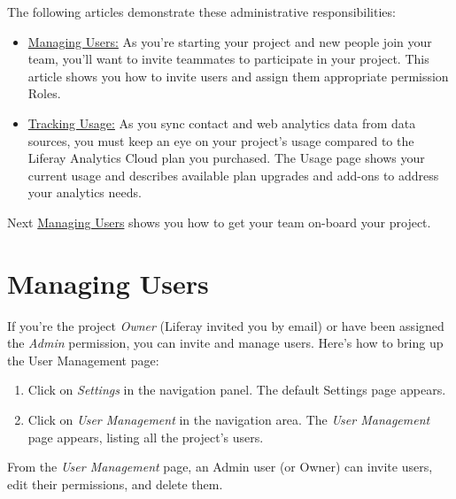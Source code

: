 The following articles demonstrate these administrative
responsibilities:

\begin{itemize}
\item
  \href{https://github.com/liferay/liferay-docs/blob/7.1.x/discover/analytics-cloud/articles/05-getting-started/02-managing-users.markdown}{Managing
  Users:} As you're starting your project and new people join your team,
  you'll want to invite teammates to participate in your project. This
  article shows you how to invite users and assign them appropriate
  permission Roles.
\item
  \href{https://github.com/liferay/liferay-docs/blob/7.1.x/discover/analytics-cloud/articles/05-getting-started/03-tracking-usage.markdown}{Tracking
  Usage:} As you sync contact and web analytics data from data sources,
  you must keep an eye on your project's usage compared to the Liferay
  Analytics Cloud plan you purchased. The Usage page shows your current
  usage and describes available plan upgrades and add-ons to address
  your analytics needs.
\end{itemize}

Next
\href{https://github.com/liferay/liferay-docs/blob/7.1.x/discover/analytics-cloud/articles/05-administering-liferay-analytics-cloud/02-managing-users.markdown}{Managing
Users} shows you how to get your team on-board your project.

\section{Managing Users}\label{managing-users}

If you're the project \emph{Owner} (Liferay invited you by email) or
have been assigned the \emph{Admin} permission, you can invite and
manage users. Here's how to bring up the User Management page:

\begin{enumerate}
\def\labelenumi{\arabic{enumi}.}
\item
  Click on \emph{Settings} in the navigation panel. The default Settings
  page appears.
\item
  Click on \emph{User Management} in the navigation area. The \emph{User
  Management} page appears, listing all the project's users.
\end{enumerate}

From the \emph{User Management} page, an Admin user (or Owner) can
invite users, edit their permissions, and delete them.

